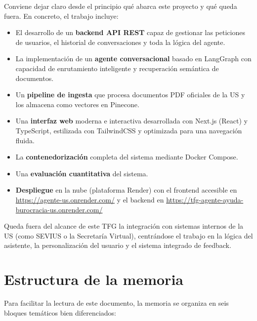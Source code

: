 \documentclass[12pt,a4paper,oneside]{report}
\begin{document}
Conviene dejar claro desde el principio qué abarca este proyecto y qué queda fuera. En concreto, el trabajo incluye:

\begin{itemize}
    \item El desarrollo de un \textbf{backend API REST} capaz de gestionar las peticiones de usuarios, el historial de conversaciones y toda la lógica del agente.
    \item La implementación de un \textbf{agente conversacional} basado en LangGraph con capacidad de enrutamiento inteligente y recuperación semántica de documentos.
    \item Un \textbf{pipeline de ingesta} que procesa documentos PDF oficiales de la US y los almacena como vectores en Pinecone.
    \item Una \textbf{interfaz web} moderna e interactiva desarrollada con Next.js (React) y TypeScript, estilizada con TailwindCSS y optimizada para una navegación fluida.
    \item La \textbf{contenedorización} completa del sistema mediante Docker Compose.
    \item Una \textbf{evaluación cuantitativa} del sistema.
    \item \textbf{Despliegue} en la nube (plataforma Render) con el frontend accesible en \url{https://agente-us.onrender.com/} y el backend en \url{https://tfg-agente-ayuda-burocracia-us.onrender.com/}
\end{itemize}

Queda fuera del alcance de este TFG la integración con sistemas internos de la US (como SEVIUS o la Secretaría Virtual), centrándose el trabajo en la lógica del asistente, la personalización del usuario y el sistema integrado de feedback.

\section{Estructura de la memoria}

Para facilitar la lectura de este documento, la memoria se organiza en seis bloques temáticos bien diferenciados:
\end{document}
